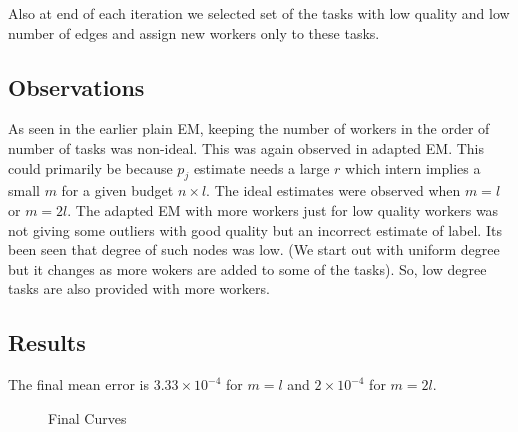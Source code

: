 \documentclass[10pt]{article}
\begin{document}
Also at end of each iteration we selected set of the tasks with low quality and low number of edges and assign new workers only to these tasks.


\subsection{Observations}

As seen in the earlier plain EM, keeping the number of workers in the order of number of tasks was non-ideal. This was again observed in adapted EM.
This could primarily be because $p_j$ estimate needs a large $r$ which intern implies a small $m$ for a given budget $n\times l$. The ideal estimates were observed when $m = l$ or $m = 2l$. The adapted EM with more workers just for low quality workers was not giving some outliers with good quality but an incorrect estimate of label. Its been seen that degree of such nodes was low. (We start out with uniform degree but it changes as more wokers are added to some of the tasks). So, low degree tasks are also provided with more workers.
    					
\subsection{Results}

The final mean error is $3.33\times 10^{-4}$ for $m = l$ and $2\times 10^{-4}$ for $m = 2l$. 
\begin{figure}%
	\centering
	\qquad
	\caption{Final Curves}%
	\label{fig:final}%
\end{figure}
\end{document}
